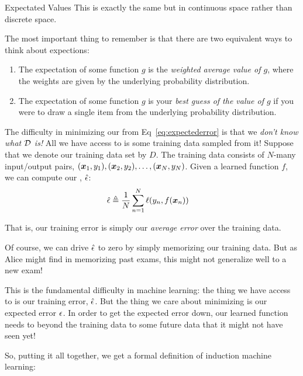 \begin{mathreview}{Expectated Values}
This is exactly the same but in continuous space rather than discrete space.

The most important thing to remember is that there are two equivalent ways to think about expections:
\begin{enumerate}
\item The expectation of some function $g$ is the \emph{weighted average value of $g$}, where the weights are given by the underlying probability distribution.
\item The expectation of some function $g$ is your \emph{best guess of the value of $g$} if you were to draw a single item from the underlying probability distribution.
\end{enumerate}
\end{mathreview}

The difficulty in minimizing our  from
Eq~\eqref{eq:expectederror} is that we \emph{don't know what $\mathcal{D}$
  is!}  All we have access to is some training data sampled from it!
Suppose that we denote our training data set by $D$.  The training
data consists of $N$-many input/output pairs, $({\boldsymbol{x}}_1,y_1),
({\boldsymbol{x}}_2,y_2), \dots, ({\boldsymbol{x}}_N,y_N)$.  Given a learned function $f$, we
can compute our , $\hat {\epsilon}$:
\begin{align} \label{eq:trainingerror}
\hat {\epsilon}
&\triangleq
\frac 1 N \sum_{n=1}^N \ell(y_n, f({\boldsymbol{x}}_n))
\end{align}

That is, our training error is simply our \emph{average error} over
the training data.  

Of course, we can drive $\hat {\epsilon}$ to zero by simply memorizing our
training data.  But as Alice might find in memorizing past exams, this
might not generalize well to a new exam!

This is the fundamental difficulty in machine learning: the thing we
have access to is our training error, $\hat {\epsilon}$.  But the thing we care
about minimizing is our expected error $\epsilon$.  In order to get the
expected error down, our learned function needs to
 beyond the training data to some future data that
it might not have seen yet!

So, putting it all together, we get a formal definition of induction
machine learning: 


